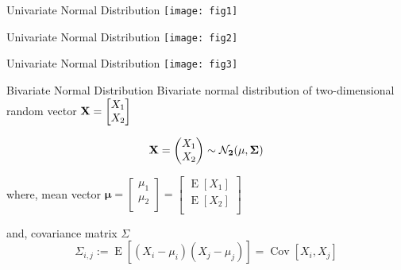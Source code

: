 \documentclass{beamer}
\begin{document}
\begin{frame}{Univariate Normal Distribution}
	\texttt{[image: fig1]} 
\end{frame}

\begin{frame}{Univariate Normal Distribution}
	\texttt{[image: fig2]}
\end{frame}


\begin{frame}{Univariate Normal Distribution}
	\texttt{[image: fig3]}
\end{frame}


\begin{frame}{Bivariate Normal Distribution}
Bivariate normal distribution of two-dimensional random vector $\bf{X} =\begin{bmatrix}
X_{1} \\
X_{2} \\
\end{bmatrix}
$

\begin{gather}
	\bf{X} = \begin{pmatrix}
	X_1 \\
	X_2
	\end{pmatrix} \sim \mathcal{N}_2 (\mu , \Sigma)
\end{gather}

where, mean vector $\bm{\mu} =\begin{bmatrix}
\mu_{1} \\
\mu_{2} \\
\end{bmatrix}
=\begin{bmatrix}
\operatorname{E}[X_{1}] \\
\operatorname{E}[X_{2}] \\
\end{bmatrix}
$

and, covariance matrix $\Sigma$
$$\Sigma_{i,j} := \operatorname{E} [(X_i - \mu_i)( X_j - \mu_j)] = \operatorname{Cov}[X_i, X_j] $$
\end{frame}
\end{document}
